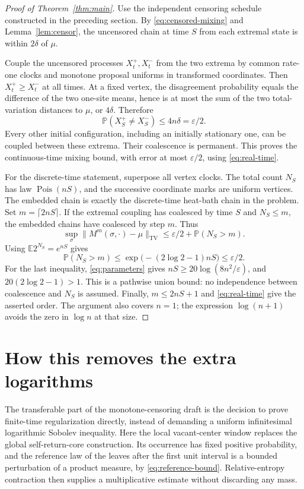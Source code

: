 \documentclass[11pt,reqno]{amsart}
\theoremstyle{remark}
\newcommand{\E}{\mathbb E}
\newcommand{\Prob}{\mathbb P}
\newcommand{\TV}{\mathrm{TV}}
\DeclareMathOperator{\Pois}{Pois}
\numberwithin{equation}{section}
\begin{document}
\begin{proof}[Proof of Theorem~\ref{thm:main}]
Use the independent censoring schedule constructed in the preceding section. By \eqref{eq:censored-mixing} and Lemma~\ref{lem:censor}, the uncensored chain at time $S$ from each extremal state is within $2\delta$ of $\mu$.

Couple the uncensored processes $X_t^+,X_t^-$ from the two extrema by common rate-one clocks and monotone proposal uniforms in transformed coordinates. Then $X_t^+\ge X_t^-$ at all times. At a fixed vertex, the disagreement probability equals the difference of the two one-site means, hence is at most the sum of the two total-variation distances to $\mu$, or $4\delta$. Therefore
\begin{equation}\label{eq:coalescence}
 \Prob(X_S^+\ne X_S^-)\le4n\delta=\varepsilon/2.
\end{equation}
Every other initial configuration, including an initially stationary one, can be coupled between these extrema. Their coalescence is permanent. This proves the continuous-time mixing bound, with error at most $\varepsilon/2$, using \eqref{eq:real-time}.

For the discrete-time statement, superpose all vertex clocks. The total count $N_S$ has law $\Pois(nS)$, and the successive coordinate marks are uniform vertices. The embedded chain is exactly the discrete-time heat-bath chain in the problem. Set $m=\lceil2nS\rceil$. If the extremal coupling has coalesced by time $S$ and $N_S\le m$, the embedded chains have coalesced by step $m$. Thus
\[
 \sup_\sigma\|M^m(\sigma,\cdot)-\mu\|_{\TV}
 \le\varepsilon/2+\Prob(N_S>m).
\]
Using $\E 2^{N_S}=e^{nS}$ gives
\[
 \Prob(N_S>m)\le\exp\bigl(-(2\log2-1)nS\bigr)\le\varepsilon/2.
\]
For the last inequality, \eqref{eq:parameters} gives $nS\ge20\log(8n^2/\varepsilon)$, and $20(2\log2-1)>1$. This is a pathwise union bound: no independence between coalescence and $N_S$ is assumed. Finally, $m\le2nS+1$ and \eqref{eq:real-time} give the asserted order. The argument also covers $n=1$; the expression $\log(n+1)$ avoids the zero in $\log n$ at that size.
\end{proof}

\section{How this removes the extra logarithms}

The transferable part of the monotone-censoring draft is the decision to prove finite-time regularization directly, instead of demanding a uniform infinitesimal logarithmic Sobolev inequality. Here the local vacant-center window replaces the global self-return-core construction. Its occurrence has fixed positive probability, and the reference law of the leaves after the first unit interval is a bounded perturbation of a product measure, by \eqref{eq:reference-bound}. Relative-entropy contraction then supplies a multiplicative estimate without discarding any mass.
\end{document}
